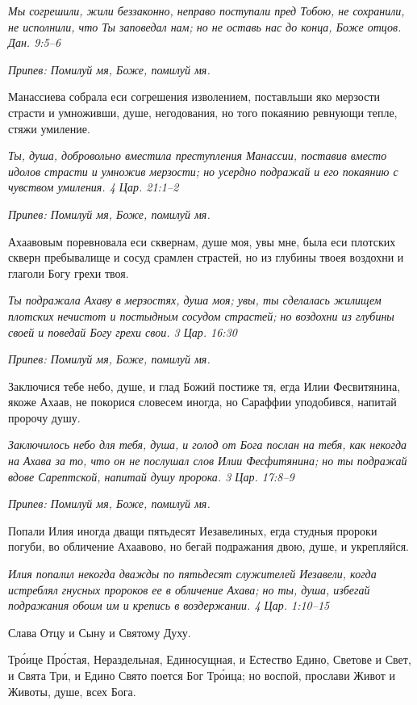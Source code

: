 \itshape Мы согрешили, жили беззаконно, неправо поступали пред Тобою, не сохранили, не исполнили, что Ты заповедал нам; но не оставь нас до конца, Боже отцов. Дан. 9:5–6\normalfont{}


\itshape Припев:\normalfont{} Помилуй мя, Боже, помилуй мя.


Манассиева собрала еси согрешения изволением, поставльши яко мерзости страсти и умноживши, душе, негодования, но того покаянию ревнующи тепле, стяжи умиление.


\itshape Ты, душа, добровольно вместила преступления Манассии, поставив вместо идолов страсти и умножив мерзости; но усердно подражай и его покаянию с чувством умиления. 4 Цар. 21:1–2\normalfont{}


\itshape Припев:\normalfont{} Помилуй мя, Боже, помилуй мя.


Ахаавовым поревновала еси сквернам, душе моя, увы мне, была еси плотских скверн пребывалище и сосуд срамлен страстей, но из глубины твоея воздохни и глаголи Богу грехи твоя.


\itshape Ты подражала Ахаву в мерзостях, душа моя; увы, ты сделалась жилищем плотских нечистот и постыдным сосудом страстей; но воздохни из глубины своей и поведай Богу грехи свои. 3 Цар. 16:30\normalfont{}


\itshape Припев:\normalfont{} Помилуй мя, Боже, помилуй мя.


Заключися тебе небо, душе, и глад Божий постиже тя, егда Илии Фесвитянина, якоже Ахаав, не покорися словесем иногда, но Сараффии уподобився, напитай пророчу душу.


\itshape Заключилось небо для тебя, душа, и голод от Бога послан на тебя, как некогда на Ахава за то, что он не послушал слов Илии Фесфитянина; но ты подражай вдове Сарептской, напитай душу пророка. 3 Цар. 17:8–9\normalfont{}


\itshape Припев:\normalfont{} Помилуй мя, Боже, помилуй мя.


Попали Илия иногда дващи пятьдесят Иезавелиных, егда студныя пророки погуби, во обличение Ахаавово, но бегай подражания двою, душе, и укрепляйся.


\itshape Илия попалил некогда дважды по пятьдесят служителей Иезавели, когда истреблял гнусных пророков ее в обличение Ахава; но ты, душа, избегай подражания обоим им и крепись в воздержании. 4 Цар. 1:10–15\normalfont{}


Слава Отцу и Сыну и Святому Духу.


Тро́ице Про́стая, Нераздельная, Единосущная, и Естество Едино, Светове и Свет, и Свята Три, и Едино Свято поется Бог Тро́ица; но воспой, прослави Живот и Животы, душе, всех Бога.


